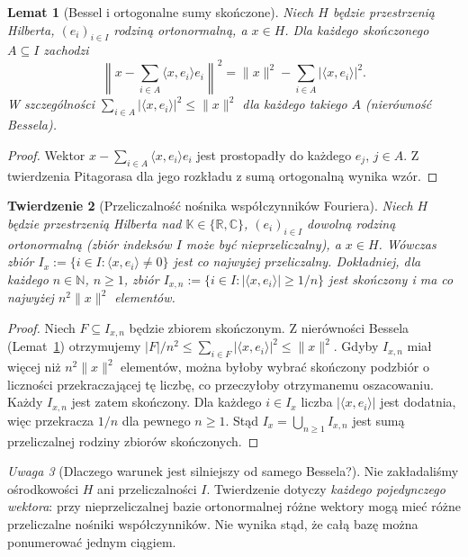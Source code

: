 \documentclass[11pt,a4paper]{article}
\numberwithin{equation}{section}
\theoremstyle{plain}
\newtheorem{twierdzenie}{Twierdzenie}[section]
\newtheorem{lemat}[twierdzenie]{Lemat}
\theoremstyle{definition}
\theoremstyle{remark}
\newtheorem{uwaga}[twierdzenie]{Uwaga}
\newcommand{\R}{\mathbb R}
\newcommand{\C}{\mathbb C}
\newcommand{\N}{\mathbb N}
\newcommand{\K}{\mathbb K}
\begin{document}
\begin{lemat}[Bessel i ortogonalne sumy skończone]
\label{lem:bessel13}
Niech $H$ będzie przestrzenią Hilberta, $(e_i)_{i\in I}$ rodziną
ortonormalną, a $x\in H$. Dla każdego skończonego $A\subseteq I$
zachodzi
\[
\left\|x-\sum_{i\in A}\langle x,e_i\rangle e_i\right\|^2
=\|x\|^2-\sum_{i\in A}|\langle x,e_i\rangle|^2.
\]
W szczególności $\sum_{i\in A}|\langle x,e_i\rangle|^2\le\|x\|^2$
dla każdego takiego $A$ (nierówność Bessela).
\end{lemat}
\begin{proof}
Wektor $x-\sum_{i\in A}\langle x,e_i\rangle e_i$ jest
prostopadły do każdego $e_j$, $j\in A$. Z twierdzenia Pitagorasa
dla jego rozkładu z sumą ortogonalną wynika wzór.
\end{proof}


\begin{twierdzenie}[Przeliczalność nośnika współczynników Fouriera]
\label{thm:countable-fourier-support13}
Niech $H$ będzie przestrzenią Hilberta nad $\K\in\{\R,\C\}$,
$(e_i)_{i\in I}$ dowolną rodziną ortonormalną (zbiór indeksów $I$
może być nieprzeliczalny), a $x\in H$. Wówczas zbiór
$ I_x:=\{i\in I:\langle x,e_i\rangle\ne0\}$
jest co najwyżej przeliczalny. Dokładniej, dla każdego $n\in\N$,
$n\ge1$, zbiór
$ I_{x,n}:=\{i\in I:|\langle x,e_i\rangle|\ge1/n\}$
jest skończony i ma co najwyżej $n^2\|x\|^2$ elementów.
\end{twierdzenie}
\begin{proof}
Niech $F\subseteq I_{x,n}$ będzie zbiorem skończonym.
Z nierówności Bessela (Lemat~\ref{lem:bessel13}) otrzymujemy
$|F|/n^2\le\sum_{i\in F}|\langle x,e_i\rangle|^2\le\|x\|^2$.
Gdyby $I_{x,n}$ miał więcej niż $n^2\|x\|^2$ elementów,
można byłoby wybrać skończony podzbiór o liczności
przekraczającej tę liczbę, co przeczyłoby otrzymanemu oszacowaniu.
Każdy $I_{x,n}$ jest zatem skończony. Dla każdego
$i\in I_x$ liczba $|\langle x,e_i\rangle|$ jest dodatnia, więc
przekracza $1/n$ dla pewnego $n\ge1$. Stąd
$I_x=\bigcup_{n\ge1}I_{x,n}$ jest sumą przeliczalnej rodziny
zbiorów skończonych.
\end{proof}

\begin{uwaga}[Dlaczego warunek jest silniejszy od samego Bessela?]
\label{rem:fourier-countability13}
Nie zakładaliśmy ośrodkowości $H$ ani przeliczalności $I$.
Twierdzenie dotyczy \emph{każdego pojedynczego wektora}:
przy nieprzeliczalnej bazie ortonormalnej różne wektory mogą
mieć różne przeliczalne nośniki współczynników. Nie wynika
stąd, że całą bazę można ponumerować jednym ciągiem.
\end{uwaga}
\end{document}
